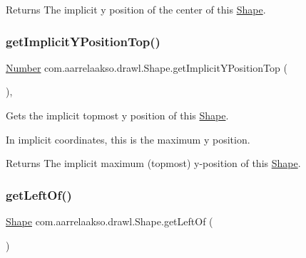\begin{DoxyReturn}{Returns}
The implicit y position of the center of this \hyperlink{classcom_1_1aarrelaakso_1_1drawl_1_1_shape}{Shape}. 
\end{DoxyReturn}
\mbox{\label{classcom_1_1aarrelaakso_1_1drawl_1_1_shape_a6a52176302dd9b5d2bfc2d25409c310e}} 
\subsubsection{\texorpdfstring{get\+Implicit\+Y\+Position\+Top()}{getImplicitYPositionTop()}}
{\footnotesize\ttfamily \hyperlink{interfacecom_1_1aarrelaakso_1_1drawl_1_1_number}{Number} com.\+aarrelaakso.\+drawl.\+Shape.\+get\+Implicit\+Y\+Position\+Top (\begin{DoxyParamCaption}{ }\end{DoxyParamCaption})\hspace{0.3cm}{\ttfamily [protected]}, {\ttfamily [inherited]}}



Gets the implicit topmost y position of this \hyperlink{classcom_1_1aarrelaakso_1_1drawl_1_1_shape}{Shape}. 

In implicit coordinates, this is the maximum y position.

\begin{DoxyReturn}{Returns}
The implicit maximum (topmost) y-\/position of this \hyperlink{classcom_1_1aarrelaakso_1_1drawl_1_1_shape}{Shape}. 
\end{DoxyReturn}
\mbox{\label{classcom_1_1aarrelaakso_1_1drawl_1_1_shape_a2b19d5964ac46d545a7bae3133df6532}} 
\subsubsection{\texorpdfstring{get\+Left\+Of()}{getLeftOf()}}
{\footnotesize\ttfamily \hyperlink{classcom_1_1aarrelaakso_1_1drawl_1_1_shape}{Shape} com.\+aarrelaakso.\+drawl.\+Shape.\+get\+Left\+Of (\begin{DoxyParamCaption}{ }\end{DoxyParamCaption})\hspace{0.3cm}{\ttfamily [inherited]}}



